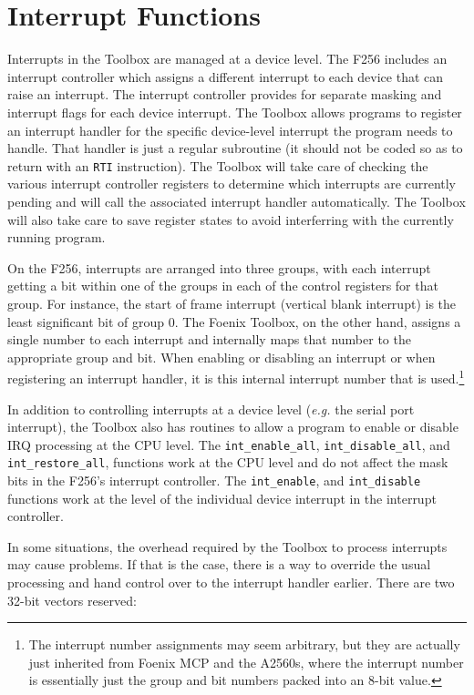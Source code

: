 \section{Interrupt Functions}
Interrupts in the Toolbox are managed at a device level.
The F256 includes an interrupt controller which assigns a different interrupt to each device that can raise an interrupt.
The interrupt controller provides for separate masking and interrupt flags for each device interrupt.
The Toolbox allows programs to register an interrupt handler for the specific device-level interrupt the program needs to handle.
That handler is just a regular subroutine (it should not be coded so as to return with an \verb+RTI+ instruction).
The Toolbox will take care of checking the various interrupt controller registers to determine which interrupts are currently pending
and will call the associated interrupt handler automatically. The Toolbox will also take care to save register states to avoid interferring
with the currently running program.

On the F256, interrupts are arranged into three groups, with each interrupt getting a bit within one of the groups in each of the 
control registers for that group. For instance, the start of frame interrupt (vertical blank interrupt) is the least significant bit of group 0.
The Foenix Toolbox, on the other hand, assigns a single number to each interrupt and internally maps that number to the appropriate group and bit.
When enabling or disabling an interrupt or when registering an interrupt handler, it is this internal interrupt number that is used.\footnote{The interrupt
number assignments may seem arbitrary, but they are actually just inherited from Foenix MCP and the A2560s, where the interrupt number is essentially just
the group and bit numbers packed into an 8-bit value.}

In addition to controlling interrupts at a device level ({\it e.g.} the serial port interrupt), the Toolbox also has routines to allow a program to
enable or disable IRQ processing at the CPU level. The \lstinline!int_enable_all!, \lstinline!int_disable_all!, and \lstinline!int_restore_all!,
functions work at the CPU level and do not affect the mask bits in the F256's interrupt controller. The \lstinline!int_enable!, and \lstinline!int_disable!
functions work at the level of the individual device interrupt in the interrupt controller.

In some situations, the overhead required by the Toolbox to process interrupts may cause problems.
If that is the case, there is a way to override the usual processing and hand control over to the interrupt handler earlier.
There are two 32-bit vectors reserved:

